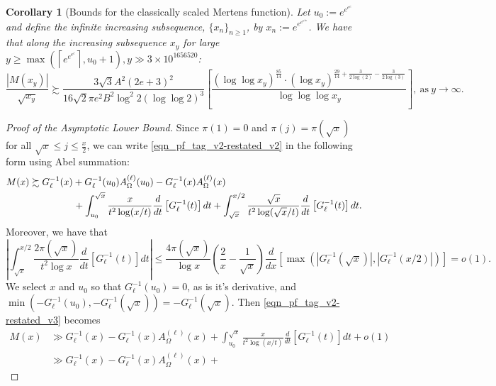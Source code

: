 \documentclass[11pt,reqno,a4letter]{article}
\numberwithin{figure}{section}
\numberwithin{table}{section}
\newcommand{\ceiling}[1]{\left\lceil #1 \right\rceil}
\theoremstyle{plain}
\newtheorem{cor}[theorem]{Corollary}
\numberwithin{theorem}{section}
\theoremstyle{definition}
\begin{document}
\begin{cor}[Bounds for the classically scaled Mertens function] 
\label{cor_ThePipeDreamResult_v1} 
Let $u_0 := e^{e^{e^{e}}}$ and define the infinite increasing subsequence, 
$\{x_n\}_{n \geq 1}$, by $x_n := e^{e^{e^{e^{4n}}}}$. 
We have that along the increasing subsequence $x_y$ for large 
$y \geq \max\left(\ceiling{e^{e^{e^{e}}}}, u_0+1\right), y \gg 3 \times 10^{1656520}$:  
\[
\frac{|M(x_{y})|}{\sqrt{x_{y}}} \succsim 
     \frac{3\sqrt{3} A^2(2e+3)^2}{16 \sqrt{2} \pi e^2 B^2 \log^2 2 (\log\log 2)^{3}} \left[ 
     \frac{(\log\log x_y)^{\frac{85}{14}} \cdot 
     (\log x_y)^{\frac{29}{14}+\frac{3}{2 \log (2)}-\frac{3}{2 \log (3)}}}{\log\log\log x_y} 
     \right], \mathrm{\ as\ } y \rightarrow \infty. 
\]
\end{cor} 
\begin{proof}[Proof of the Asymptotic Lower Bound] 
Since $\pi(1) = 0$ and $\pi(j) = \pi(\sqrt{x})$ for all $\sqrt{x} \leq j \leq \frac{x}{2}$, 
we can write \eqref{eqn_pf_tag_v2-restated_v2} in the following form using Abel summation: 
\begin{align} 
\label{eqn_pf_tag_v2-restated_v3} 
M(x) & \succsim G_{\ell}^{-1}(x) + G_{\ell}^{-1}(u_0) A_{\Omega}^{(\ell)}(u_0) - 
      G_{\ell}^{-1}(x) A_{\Omega}^{(\ell)}(x) \\ 
\notag 
      & \phantom{\succsim G_{ell}^{-1}(x)\ } + 
      \int_{u_0}^{\sqrt{x}} 
      \frac{x}{t^2 \log(x/t)} \frac{d}{dt}\left[G_{\ell}^{-1}(t)\right] dt + 
      \int_{\sqrt{x}}^{x/2} 
      \frac{\sqrt{x}}{t^2 \log(\sqrt{x}/t)} \frac{d}{dt}\left[G_{\ell}^{-1}(t)\right] dt. 
\end{align} 
Moreover, we have that 
\[
\left\lvert \int_{\sqrt{x}}^{x/2} \frac{2\pi(\sqrt{x})}{t^2 \log x} 
     \frac{d}{dt}\left[G_{\ell}^{-1}(t)\right] dt \right\rvert \leq 
     \frac{4 \pi(\sqrt{x})}{\log x} \left(\frac{2}{x} - \frac{1}{\sqrt{x}}\right) 
     \frac{d}{dx}\left[\max\left(|G_{\ell}^{-1}(\sqrt{x})|, |G_{\ell}^{-1}(x/2)|\right)\right] 
     = o(1). 
\]
We select $x$ and $u_0$ so that $G_{\ell}^{-1}(u_0) = 0$, as is it's derivative, and 
$\min(-G_{\ell}^{-1}(u_0), -G_{\ell}^{-1}(\sqrt{x})) = -G_{\ell}^{-1}(\sqrt{x})$. 
Then \eqref{eqn_pf_tag_v2-restated_v3} becomes 
\begin{align*} 
M(x) & \gg G_{\ell}^{-1}(x) - G_{\ell}^{-1}(x) A_{\Omega}^{(\ell)}(x) + \int_{u_0}^{\sqrt{x}} 
      \frac{x}{t^2 \log(x/t)} \frac{d}{dt}\left[G_{\ell}^{-1}(t)\right] dt + o(1) \\ 
     & \gg G_{\ell}^{-1}(x) - G_{\ell}^{-1}(x) A_{\Omega}^{(\ell)}(x) + 

\end{align*}
\end{proof}
\end{document}
